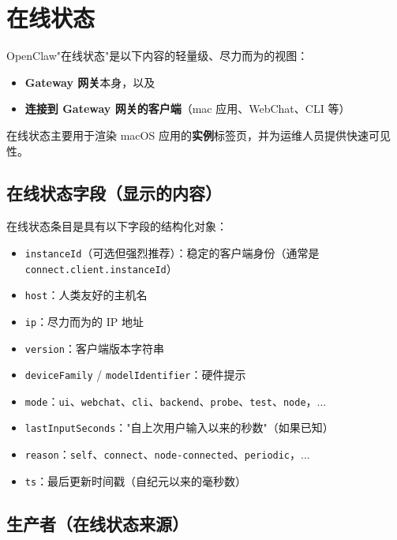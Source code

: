 \clearpage

\section{在线状态}


OpenClaw"在线状态"是以下内容的轻量级、尽力而为的视图：

\begin{itemize}
  \item \textbf{Gateway 网关}本身，以及
  \item \textbf{连接到 Gateway 网关的客户端}（mac 应用、WebChat、CLI 等）
\end{itemize}


在线状态主要用于渲染 macOS 应用的\textbf{实例}标签页，并为运维人员提供快速可见性。

\subsection{在线状态字段（显示的内容）}


在线状态条目是具有以下字段的结构化对象：

\begin{itemize}
  \item \texttt{instanceId}（可选但强烈推荐）：稳定的客户端身份（通常是 \texttt{connect.client.instanceId}）
  \item \texttt{host}：人类友好的主机名
  \item \texttt{ip}：尽力而为的 IP 地址
  \item \texttt{version}：客户端版本字符串
  \item \texttt{deviceFamily} / \texttt{modelIdentifier}：硬件提示
  \item \texttt{mode}：\texttt{ui}、\texttt{webchat}、\texttt{cli}、\texttt{backend}、\texttt{probe}、\texttt{test}、\texttt{node}，...
  \item \texttt{lastInputSeconds}："自上次用户输入以来的秒数"（如果已知）
  \item \texttt{reason}：\texttt{self}、\texttt{connect}、\texttt{node-connected}、\texttt{periodic}，...
  \item \texttt{ts}：最后更新时间戳（自纪元以来的毫秒数）
\end{itemize}


\subsection{生产者（在线状态来源）}


